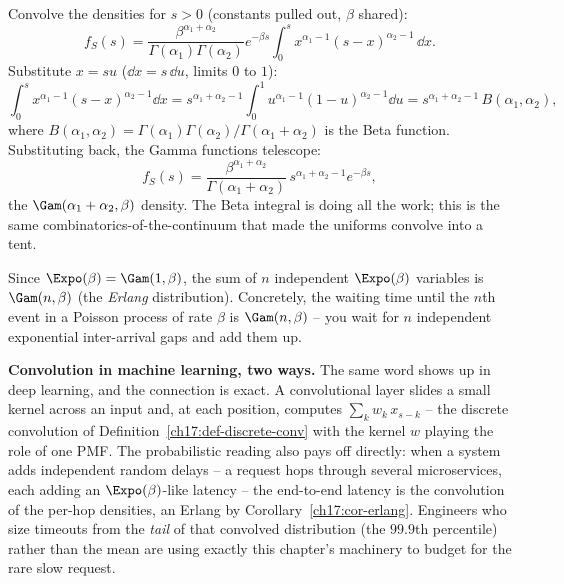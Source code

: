 \begin{whybox}
Convolve the densities for $s>0$ (constants pulled out, $\beta$ shared):
\[
f_S(s) = \frac{\beta^{\alpha_1+\alpha_2}}{\Gamma(\alpha_1)\Gamma(\alpha_2)}
         e^{-\beta s}\int_0^s x^{\alpha_1-1}(s-x)^{\alpha_2-1}\,\dd x.
\]
Substitute $x=su$ ($\dd x = s\,\dd u$, limits $0$ to $1$):
\[
\int_0^s x^{\alpha_1-1}(s-x)^{\alpha_2-1}\dd x
 = s^{\alpha_1+\alpha_2-1}\int_0^1 u^{\alpha_1-1}(1-u)^{\alpha_2-1}\dd u
 = s^{\alpha_1+\alpha_2-1}\,B(\alpha_1,\alpha_2),
\]
where $B(\alpha_1,\alpha_2)=\Gamma(\alpha_1)\Gamma(\alpha_2)/\Gamma(\alpha_1+\alpha_2)$
is the Beta function. Substituting back, the Gamma functions telescope:
\[
f_S(s) = \frac{\beta^{\alpha_1+\alpha_2}}{\Gamma(\alpha_1+\alpha_2)}\,
         s^{\alpha_1+\alpha_2-1}e^{-\beta s},
\]
the $\Gam(\alpha_1+\alpha_2,\beta)$ density. The Beta integral is doing all
the work; this is the same combinatorics-of-the-continuum that made the
uniforms convolve into a tent.
\end{whybox}

\begin{corollary}
\label{ch17:cor-erlang}
Since $\Expo(\beta)=\Gam(1,\beta)$, the sum of $n$ independent
$\Expo(\beta)$ variables is $\Gam(n,\beta)$ (the \emph{Erlang}
distribution). Concretely, the waiting time until the $n$th event in a
Poisson process of rate $\beta$ is $\Gam(n,\beta)$ -- you wait for $n$
independent exponential inter-arrival gaps and add them up.
\end{corollary}

\begin{applicationbox}
\textbf{Convolution in machine learning, two ways.} The same word shows up
in deep learning, and the connection is exact. A convolutional layer slides
a small kernel across an input and, at each position, computes
$\sum_k w_k\,x_{s-k}$ -- the discrete convolution of
Definition~\ref{ch17:def-discrete-conv} with the kernel $w$ playing the role
of one PMF. The probabilistic reading also pays off directly: when a system
adds independent random delays -- a request hops through several
microservices, each adding an $\Expo(\beta)$-like latency -- the end-to-end
latency is the convolution of the per-hop densities, an Erlang by
Corollary~\ref{ch17:cor-erlang}. Engineers who size timeouts from the
\emph{tail} of that convolved distribution (the $99.9$th percentile) rather
than the mean are using exactly this chapter's machinery to budget for the
rare slow request.
\end{applicationbox}

